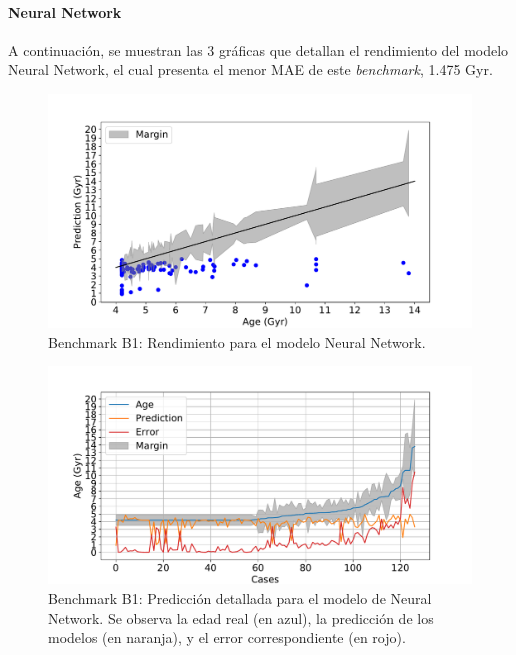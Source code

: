 \paragraph{Neural Network} 
A continuación, se muestran las 3 gráficas que detallan el rendimiento del modelo Neural Network, el cual presenta el menor MAE de este \emph{benchmark}, 1.475 Gyr. %

\begin{figure}[H]
\begin{center}
 \includegraphics[width=0.8\linewidth]{Figuras/Experimentos/B_B1_nnet_1.pdf}
\end{center}
\caption{Benchmark B1: Rendimiento para el modelo Neural Network.}
 \label{fig:benchB1_best_1}
\end{figure}

\begin{figure}[H]
\begin{center}
 \includegraphics[width=0.8\linewidth]{Figuras/Experimentos/B_B1_nnet_2.pdf}
\end{center}
\caption{Benchmark B1: Predicción detallada para el modelo de Neural Network. Se observa la edad real (en azul), la predicción de los modelos (en naranja), y el error correspondiente (en rojo).}
 \label{fig:benchB1_best_2}
\end{figure}

